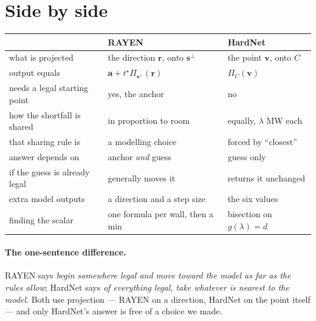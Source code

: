 \documentclass[11pt]{article}
\begin{document}
\section{Side by side}

\begin{center}
\begin{tabular}{lll}
\toprule
 & \textbf{RAYEN} & \textbf{HardNet} \\
\midrule
what is projected & the direction $\mathbf{r}$, onto $\mathbf{s}^{\perp}$ & the point $\mathbf{v}$, onto $C$ \\
output equals & $\mathbf{a}+t^\star\Pi_{\mathbf{s}^{\perp}}(\mathbf{r})$ & $\Pi_C(\mathbf{v})$ \\
needs a legal starting point & yes, the anchor & no \\
how the shortfall is shared & in proportion to room & equally, $\lambda$ MW each \\
that sharing rule is & a modelling choice & forced by ``closest'' \\
answer depends on & anchor \emph{and} guess & guess only \\
if the guess is already legal & generally moves it & returns it unchanged \\
extra model outputs & a direction and a step size & the six values \\
finding the scalar & one formula per wall, then a min & bisection on $g(\lambda)=d$ \\
\bottomrule
\end{tabular}
\end{center}

\paragraph{The one-sentence difference.} RAYEN says \emph{begin somewhere legal and
move toward the model as far as the rules allow}; HardNet says \emph{of everything
legal, take whatever is nearest to the model}. Both use projection --- RAYEN on a
direction, HardNet on the point itself --- and only HardNet's answer is free of a
choice we made.
\end{document}
